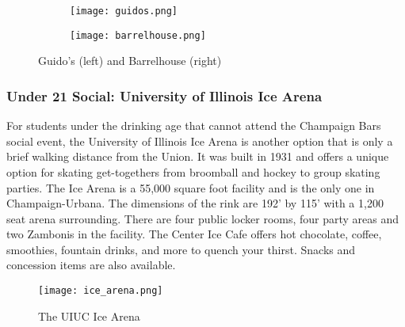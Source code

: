 \begin{figure}[H]
	\centering
	\begin{subfigure}{0.5\textwidth}
		\centering
		\texttt{[image: guidos.png]}
	\end{subfigure}%
	\begin{subfigure}{0.5\textwidth}
		\centering
		\texttt{[image: barrelhouse.png]}
	\end{subfigure}	
	\caption{Guido's (left) and Barrelhouse (right)}	
\end{figure}


\subsubsection{Under 21 Social: University of Illinois Ice Arena}
For students under the drinking age that cannot attend the Champaign Bars social event, the University of Illinois Ice Arena is another option that is only a brief walking distance from the Union. It was built in 1931 and offers a unique option for skating get-togethers from broomball and hockey to group skating parties. The Ice Arena is a 55,000 square foot facility and is the only one in Champaign-Urbana. The dimensions of the rink are 192' by 115' with a 1,200 seat arena surrounding. There are four public locker rooms, four party areas and two Zambonis in the facility. The Center Ice Cafe offers hot chocolate, coffee, smoothies, fountain drinks, and more to quench your thirst. Snacks and concession items are also available.
\vspace{0.5cm}\newline
\begin{figure}[H]
	\centering
	\texttt{[image: ice\_arena.png]}
	\caption{The UIUC Ice Arena}
\end{figure}

